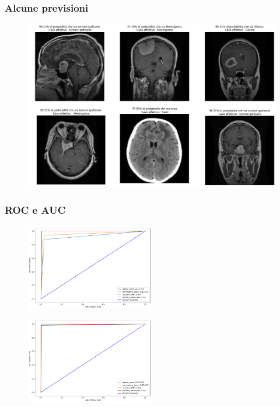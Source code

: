 \documentclass{beamer}
\begin{document}
	\begin{frame}
		\frametitle{Alcune previsioni}
		\begin{figure}

			\includegraphics[width=1\textwidth]{results-brain-tumor-alex-net-noise.png}
		\end{figure}
		\end{frame}
	
		\begin{frame}
			\frametitle{ROC e AUC}
			\begin{figure}
				\includegraphics[width=0.5\textwidth]{roc-alexnet.png}
			\end{figure}
			\begin{figure}
				\includegraphics[width=0.5\textwidth]{ROC-pretrained.png}
			\end{figure}
			\end{frame}
\end{document}
